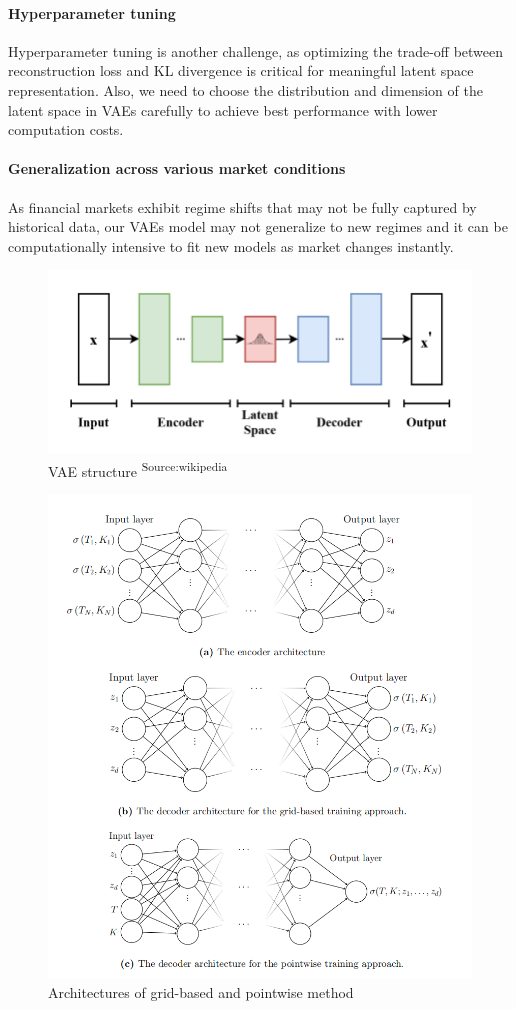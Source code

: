 \documentclass{article}
\begin{document}
\paragraph{Hyperparameter tuning} Hyperparameter tuning is another challenge, as optimizing the trade-off between reconstruction loss and KL divergence is critical for meaningful latent space representation. Also, we need to choose the distribution and dimension of the latent space in VAEs carefully to achieve best performance with lower computation costs.

\paragraph{Generalization across various market conditions}
 As financial markets exhibit regime shifts that may not be fully captured by historical data, our VAEs model may not generalize to new regimes and it can be computationally intensive to fit new models as market changes instantly.


\newpage

\begin{figure}[htp]
    \centering
    \includegraphics[width=0.5\linewidth]{vaewiki.png}
    \caption{VAE structure \textsuperscript{Source:wikipedia}}
    \label{fig:a}
\end{figure}
\begin{figure}[htp]
    \centering
    \includegraphics[width=0.8\linewidth]{vae_vol.png}
    \caption{Architectures of grid-based and pointwise method}
    \label{fig:b}
\end{figure}
\end{document}
